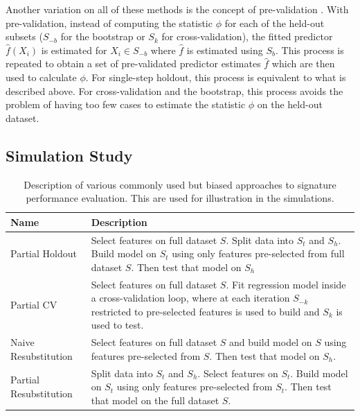 \documentclass[12pt,]{article}
\begin{document}
Another variation on all of these methods is the concept of
pre-validation \citep{tibshirani2002pre}. With pre-validation, instead
of computing the statistic \(\phi\) for each of the held-out subsets
(\(S_{-b}\) for the bootstrap or \(S_{k}\) for cross-validation), the
fitted predictor \(\hat{f}(X_i)\) is estimated for \(X_i \in S_{-b}\)
where \(\hat{f}\) is estimated using \(S_{b}\). This process is repeated
to obtain a set of pre-validated predictor estimates \(\hat{f}\) which
are then used to calculate \(\phi\). For single-step holdout, this
process is equivalent to what is described above. For cross-validation
and the bootstrap, this process avoids the problem of having too few
cases to estimate the statistic \(\phi\) on the held-out dataset.

\subsection{Simulation Study}\label{simulation-study}

\begin{table}
\caption{Description of various commonly used but biased approaches to signature performance evaluation. This are used for illustration in the simulations. \label{descript} }
\begin{center}
\begin{tabular}[!ht]{l|p{3in}}
Name & Description \\
\hline
Partial Holdout & Select features on full dataset $S$. Split data into $S_t$ and $S_h$. Build model on $S_t$ using only features pre-selected from full dataset $S$. Then test that model on $S_h$ \\
Partial CV  & Select features on full dataset $S$. Fit regression model inside a cross-validation loop, where at each iteration $S_{-k}$ restricted to pre-selected features is used to build and $S_k$ is used to test. \\
Naive Resubstitution & Select features on full dataset $S$ and build model on $S$ using features pre-selected from $S$. Then test that model on $S_h$. \\
Partial Resubstitution & Split data into $S_t$ and $S_h$. Select features on $S_t$. Build model on $S_t$ using only features pre-selected from $S_t$. Then test that model on the full dataset $S$. \\
\end{tabular}
\end{center}
\end{table}
\end{document}
